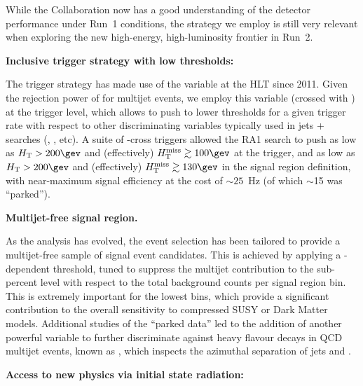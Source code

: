 
While the Collaboration now has a good understanding of the detector
performance under Run~1 conditions, the strategy we employ is still
 very relevant when exploring the new high-energy, high-luminosity
frontier in Run~2.

{\bf Inclusive trigger strategy with low thresholds:}

The trigger strategy has made use of the \alphat variable at the HLT
since 2011. Given the rejection power of \alphat for multijet events,
we employ this variable (crossed with \scalht) at the trigger level,
which allows to push to lower thresholds for a given trigger rate with
respect to other discriminating variables typically used in jets +
\met searches (\eg \met, \mht, etc). A suite of \scalht-\alphat cross
triggers allowed the RA1 search to push as low as $\scalht > 200\gev$
and (effectively) $\mht \gtrsim 100\gev$ at the trigger, and as low as
$\scalht > 200\gev$ and (effectively) $\mht \gtrsim 130\gev$ in the
signal region definition, with near-maximum signal efficiency at the
cost of $\sim25$~Hz (of which $\sim$15 was ``parked''). 

{\bf Multijet-free signal region.}

As the analysis has evolved, the event selection has been tailored to
provide a multijet-free sample of signal event candidates. This is
achieved by applying a \scalht-dependent \alphat threshold, tuned to
suppress the multijet contribution to the sub-percent level with
respect to the total background counts per signal region bin. This is
extremely important for the lowest \scalht bins, which provide a
significant contribution to the overall sensitivity to compressed SUSY
or Dark Matter models. Additional studies of the ``parked data'' led
to the addition of another powerful variable to further discriminate
against heavy flavour decays in QCD multijet events, known as \bdphi,
which inspects the azimuthal separation of jets and \met.

{\bf Access to new physics via initial state radiation:}

